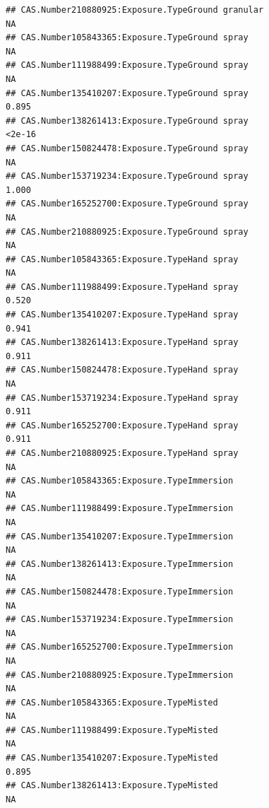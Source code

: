 \documentclass[
  12pt,
]{article}
\begin{document}
\begin{verbatim}
## CAS.Number210880925:Exposure.TypeGround granular                                      NA
## CAS.Number105843365:Exposure.TypeGround spray                                         NA
## CAS.Number111988499:Exposure.TypeGround spray                                         NA
## CAS.Number135410207:Exposure.TypeGround spray                                      0.895
## CAS.Number138261413:Exposure.TypeGround spray                                     <2e-16
## CAS.Number150824478:Exposure.TypeGround spray                                         NA
## CAS.Number153719234:Exposure.TypeGround spray                                      1.000
## CAS.Number165252700:Exposure.TypeGround spray                                         NA
## CAS.Number210880925:Exposure.TypeGround spray                                         NA
## CAS.Number105843365:Exposure.TypeHand spray                                           NA
## CAS.Number111988499:Exposure.TypeHand spray                                        0.520
## CAS.Number135410207:Exposure.TypeHand spray                                        0.941
## CAS.Number138261413:Exposure.TypeHand spray                                        0.911
## CAS.Number150824478:Exposure.TypeHand spray                                           NA
## CAS.Number153719234:Exposure.TypeHand spray                                        0.911
## CAS.Number165252700:Exposure.TypeHand spray                                        0.911
## CAS.Number210880925:Exposure.TypeHand spray                                           NA
## CAS.Number105843365:Exposure.TypeImmersion                                            NA
## CAS.Number111988499:Exposure.TypeImmersion                                            NA
## CAS.Number135410207:Exposure.TypeImmersion                                            NA
## CAS.Number138261413:Exposure.TypeImmersion                                            NA
## CAS.Number150824478:Exposure.TypeImmersion                                            NA
## CAS.Number153719234:Exposure.TypeImmersion                                            NA
## CAS.Number165252700:Exposure.TypeImmersion                                            NA
## CAS.Number210880925:Exposure.TypeImmersion                                            NA
## CAS.Number105843365:Exposure.TypeMisted                                               NA
## CAS.Number111988499:Exposure.TypeMisted                                               NA
## CAS.Number135410207:Exposure.TypeMisted                                            0.895
## CAS.Number138261413:Exposure.TypeMisted                                               NA

\end{verbatim}
\end{document}
